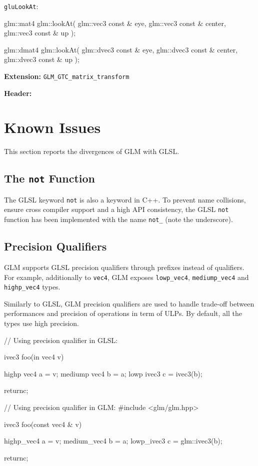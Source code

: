 \documentclass{scrartcl}
\numberwithin{figure}{subsection}
\begin{document}
\verb|gluLookAt|:

\begin{cppcode}
glm::mat4 glm::lookAt(
  glm::vec3 const & eye,
  glm::vec3 const & center,
  glm::vec3 const & up
);

glm::dmat4 glm::lookAt(
  glm::dvec3 const & eye,
  glm::dvec3 const & center,
  glm::dvec3 const & up
);
\end{cppcode}

\textbf{Extension:} \verb|GLM_GTC_matrix_transform|

\textbf{Header:} 
 


\section{Known Issues}
This section reports the divergences of GLM with GLSL.

\subsection{The \texttt{not} Function}

The GLSL keyword \verb|not| is also a keyword in C++. To prevent name collisions, ensure cross compiler support and a high API consistency, the GLSL \verb|not| function has been implemented with the name \verb|not_| (note the underscore).

\subsection{Precision Qualifiers}

GLM supports GLSL precision qualifiers through prefixes instead of qualifiers. For example, additionally to \verb|vec4|, GLM exposes \verb|lowp_vec4|, \verb|mediump_vec4| and \verb|highp_vec4| types.

Similarly to GLSL, GLM precision qualifiers are used to handle trade-off between performances and precision of operations in term of ULPs. 
By default, all the types use high precision.

\begin{glslcode}
// Using precision qualifier in GLSL:

ivec3 foo(in vec4 v)
{
  highp vec4 a = v;
  mediump vec4 b = a;
  lowp ivec3 c = ivec3(b);

  returnc;
}
\end{glslcode}

\begin{cppcode}
// Using precision qualifier in GLM:
#include <glm/glm.hpp>

ivec3 foo(const vec4 & v)
{
  highp_vec4 a = v;
  medium_vec4 b = a;
  lowp_ivec3 c = glm::ivec3(b);

  returnc;
}
\end{cppcode}
\end{document}

